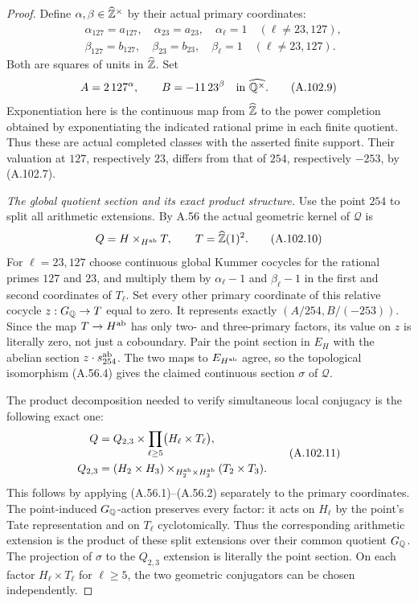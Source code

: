 \begin{proof}
Define $\alpha,\beta\in\widehat{\mathbb Z}^\times$ by their
actual primary coordinates:
\[
 \begin{split}
  &\alpha_{127}=a_{127},\quad\alpha_{23}=a_{23},
       \quad \alpha_\ell=1\quad(\ell\ne23,127),\\
  &\beta_{127}=b_{127},\quad\beta_{23}=b_{23},
       \quad \beta_\ell=1\quad(\ell\ne23,127).
 \end{split}
\tag{A.102.8}
\]
Both are squares of units in $\widehat{\mathbb Z}$.
Set
\[
                 A=2\,127^\alpha,
                  \qquad B=-11\,23^\beta
                           \quad\text{in }\widehat{\mathbb Q^\times}.
\tag{A.102.9}
\]
Exponentiation here is the continuous map from
$\widehat{\mathbb Z}$ to the power completion obtained by
exponentiating the indicated rational prime in each
finite quotient.  Thus these are actual completed
classes with the asserted finite support.
Their valuation at $127$, respectively $23$, differs
from that of $254$, respectively $-253$, by (A.102.7).

\emph{The global quotient section and its exact product structure.}
Use the point $254$ to split all arithmetic extensions.
By A.56 the actual geometric kernel of $\mathcal Q$ is
\[
          Q=H\mathbin{\times}_{H^{\rm ab}}T,
              \qquad T=\widehat{\mathbb Z}(1)^2.
\tag{A.102.10}
\]
For $\ell=23,127$ choose continuous global Kummer
cocycles for the rational primes $127$ and $23$, and
multiply them by $\alpha_\ell-1$ and $\beta_\ell-1$
in the first and second coordinates of $T_\ell$.
Set every other primary coordinate of this relative
cocycle $z:G_\mathbb Q\to T$ equal to zero.
It represents exactly
$(A/254,B/(-253))$.
Since the map $T\to H^{\rm ab}$ has only two- and
three-primary factors, its value on $z$ is literally
zero, not just a coboundary.
Pair the point section in $E_H$ with the abelian
section $z\cdot s_{254}^{\rm ab}$.
The two maps to $E_{H^{\rm ab}}$ agree, so the
topological isomorphism (A.56.4) gives the claimed
continuous section $\sigma$ of $\mathcal Q$.

The product decomposition needed to verify simultaneous
local conjugacy is the following exact one:
\[
 \begin{split}
  Q&=Q_{2,3}\times
          \prod_{\ell\ge5}\bigl(H_\ell\times T_\ell\bigr),\\
  Q_{2,3}&=(H_2\times H_3)
       \mathbin{\times}_{H_2^{\rm ab}\times H_3^{\rm ab}}
                          (T_2\times T_3).
 \end{split}
\tag{A.102.11}
\]
This follows by applying (A.56.1)--(A.56.2) separately
to the primary coordinates.  The point-induced
$G_\mathbb Q$-action preserves every factor: it acts on
$H_\ell$ by the point's Tate representation and on
$T_\ell$ cyclotomically.  Thus the corresponding
arithmetic extension is the product of these split
extensions over their common quotient $G_\mathbb Q$.
The projection of $\sigma$ to the $Q_{2,3}$ extension
is literally the point section.  On each factor
$H_\ell\times T_\ell$ for $\ell\ge5$, the two
geometric conjugators can be chosen independently.


\end{proof}
